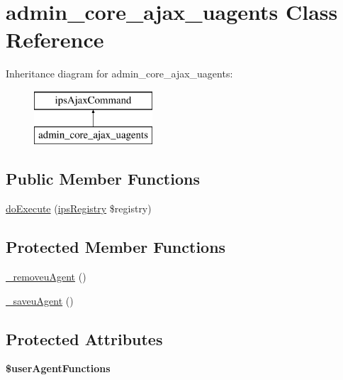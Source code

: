 \hypertarget{classadmin__core__ajax__uagents}{\section{admin\-\_\-core\-\_\-ajax\-\_\-uagents Class Reference}
\label{classadmin__core__ajax__uagents}
}
Inheritance diagram for admin\-\_\-core\-\_\-ajax\-\_\-uagents\-:\begin{figure}[H]
\begin{center}
\leavevmode
\includegraphics[height=2.000000cm]{classadmin__core__ajax__uagents}
\end{center}
\end{figure}
\subsection*{Public Member Functions}
\begin{DoxyCompactItemize}
\item 
\hyperlink{classadmin__core__ajax__uagents_afbc4e912a0604b94d47d66744c64d8ba}{do\-Execute} (\hyperlink{classips_registry}{ips\-Registry} \$registry)
\end{DoxyCompactItemize}
\subsection*{Protected Member Functions}
\begin{DoxyCompactItemize}
\item 
\hyperlink{classadmin__core__ajax__uagents_a3ed5cc50fb89484d3ff8f6587253a377}{\-\_\-removeu\-Agent} ()
\item 
\hyperlink{classadmin__core__ajax__uagents_ab4cf6a1b0419d4a2fb0277ae988b3427}{\-\_\-saveu\-Agent} ()
\end{DoxyCompactItemize}
\subsection*{Protected Attributes}
\begin{DoxyCompactItemize}
\item 
\hypertarget{classadmin__core__ajax__uagents_a151defd58dc1c54abb965c466167b315}{{\bfseries \$user\-Agent\-Functions}}\label{classadmin__core__ajax__uagents_a151defd58dc1c54abb965c466167b315}

\end{DoxyCompactItemize}


